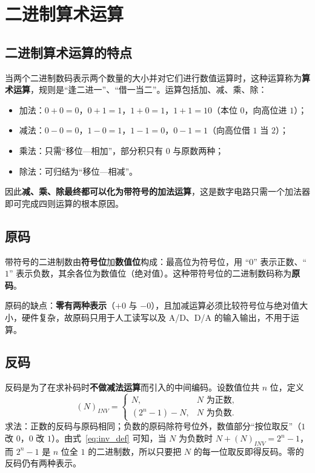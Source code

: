\section{二进制算术运算}
\subsection{二进制算术运算的特点}
当两个二进制数码表示两个数量的大小并对它们进行数值运算时，这种运算称为\textbf{算术运算}，规则是``逢二进一''、``借一当二''。运算包括加、减、乘、除：
\begin{itemize}
    \item 加法：$0+0=0$，$0+1=1$，$1+0=1$，$1+1=10$（本位 $0$，向高位进 $1$）；
    \item 减法：$0-0=0$，$1-0=1$，$1-1=0$，$0-1=1$（向高位借 $1$ 当 $2$）；
    \item 乘法：只需``移位—相加''，部分积只有 $0$ 与原数两种；
    \item 除法：可归结为``移位—相减''。
\end{itemize}
因此\textbf{减、乘、除最终都可以化为带符号的加法运算}，这是数字电路只需一个加法器即可完成四则运算的根本原因。

\subsection{原码}
带符号的二进制数由\textbf{符号位}加\textbf{数值位}构成：最高位为符号位，用 ``$0$'' 表示正数、``$1$'' 表示负数，其余各位为数值位（绝对值）。这种带符号位的二进制数码称为\textbf{原码}。

原码的缺点：\textbf{零有两种表示}（$+0$ 与 $-0$），且加减运算必须比较符号位与绝对值大小，硬件复杂，故原码只用于人工读写以及 A/D、D/A 的输入输出，不用于运算。

\subsection{反码}
反码是为了在求补码时\textbf{不做减法运算}而引入的中间编码。设数值位共 $n$ 位，定义
\begin{equation}
(N)_{INV}=
\begin{cases}
N, & N \text{ 为正数},\\[2pt]
(2^{n}-1)-N, & N \text{ 为负数}.
\end{cases}
\label{eq:inv_def}
\end{equation}
求法：正数的反码与原码相同；负数的原码除符号位外，数值部分``按位取反''（$1$ 改 $0$，$0$ 改 $1$）。由式~\eqref{eq:inv_def} 可知，当 $N$ 为负数时 $N+(N)_{INV}=2^{n}-1$，而 $2^{n}-1$ 是 $n$ 位全 $1$ 的二进制数，所以只要把 $N$ 的每一位取反即得反码。零的反码仍有两种表示。


